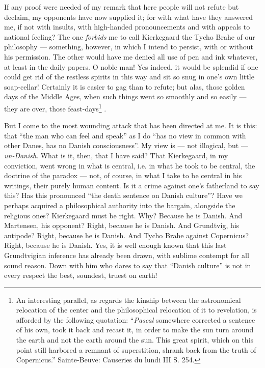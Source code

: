 \documentclass[12pt,a4paper,openany]{book}
\renewcommand{\thefootnote}{*)}
\newcommand{\fnmark}[2]{\renewcommand{\thefootnote}{#1}\footnote{#2}%
  \renewcommand{\thefootnote}{*)}}
\newcommand{\opage}[1]{\marginnote{\footnotesize\textit{[#1]}}}
\begin{document}
If any proof were needed of my remark that here people will
not refute but declaim, my opponents have now supplied it; for
with what have they answered me, if not with insults, with
high-handed pronouncements and with appeals to national feeling?
The one \emph{forbids} me to call Kierkegaard the Tycho Brahe of our
philosophy --- something, however, in which I intend to persist,
with or without his permission. The other would have me denied
all use of pen and ink whatever, at least in the daily papers. O
noble man! Yes indeed, it would be splendid if one could get rid
of the restless spirits in this way and sit so snug in one's own
little soap-cellar! Certainly it is easier to gag than to
\opage{104}refute; but alas, those golden days of the Middle Ages, when such
things went so smoothly and so easily --- they are over, those
feast-days\fnmark{*)}{An
interesting parallel, as regards the kinship between the
astronomical relocation of the center and the philosophical
relocation of it to revelation, is afforded by the following
quotation: ``\emph{Pascal} somewhere corrected a sentence of his
own, took it back and recast it, in order to make the sun turn
around the earth and not the earth around the sun. This great
spirit, which on this point still harbored a remnant of
superstition, shrank back from the truth of Copernicus.''\endgraf
Sainte-Beuve: Causeries du lundi III S. 254.}.

But I come to the most wounding attack that has been directed
at me. It is this: that ``the man who can feel and speak'' as I
do ``has no view in common with other Danes, has no Danish
consciousness''. My view is --- not illogical, but ---
\emph{un-Danish}. What is it, then, that I have said? That
Kierkegaard, in my conviction, went wrong in what is central,
i.e. in what he took to be central, the doctrine of the
paradox --- not, of course, in what I take to be central in his
writings, their purely human content. Is it a crime against one's
fatherland to say this? Has this pronounced ``the death sentence
on Danish culture''? Have we perhaps acquired a
philosophical authority into the bargain, alongside the religious
ones? Kierkegaard must be right. Why? Because he is Danish. And
Martensen, his opponent? Right, because he is Danish. And
Grundtvig, his antipode? Right, because he is Danish. And Tycho
Brahe against Copernicus? Right, because he is Danish. Yes, it is
well enough known that this last Grundtvigian inference has
already been drawn, with sublime contempt for all sound reason.
Down with him who dares to say that ``Danish culture'' is not in
every respect the best, soundest, truest on earth!
\end{document}

